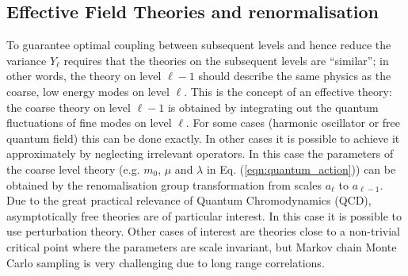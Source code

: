 \documentclass[11pt]{article}
\begin{document}
\subsection{Effective Field Theories and renormalisation}
To guarantee optimal coupling between subsequent levels and hence reduce the variance $Y_\ell$ requires that the theories on the subsequent levels are ``similar''; in other words, the theory on level $\ell-1$ should describe the same physics as the coarse, low energy modes on level $\ell$. This is the concept of an effective theory: the coarse theory on level $\ell-1$ is obtained by integrating out the quantum fluctuations of fine modes on level $\ell$. For some cases (harmonic oscillator or free quantum field) this can be done exactly. In other cases it is possible to achieve it approximately by neglecting irrelevant operators. In this case the parameters of the coarse level theory (e.g. $m_0$, $\mu$ and $\lambda$ in Eq. (\ref{eqn:quantum_action})) can be obtained by the renomalisation group transformation from scales $a_\ell$ to $a_{\ell-1}$. Due to the great practical relevance of Quantum Chromodynamics (QCD), asymptotically free theories are of particular interest. In this case it is possible to use perturbation theory. Other cases of interest are theories close to a non-trivial critical point where the parameters are scale invariant, but Markov chain Monte Carlo sampling is very challenging due to long range correlations.
\end{document}
